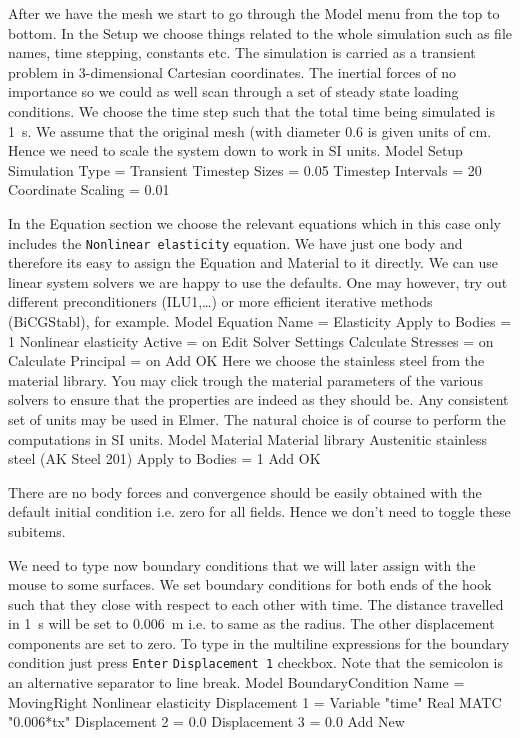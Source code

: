 After we have the mesh we start to go through the Model menu from the top to bottom. 
In the Setup we choose things related to the whole simulation such as file names, 
time stepping, constants etc.
The simulation is carried as a transient problem in 3-dimensional Cartesian
coordinates. The inertial forces of no importance so we could as well scan through a set of steady state
loading conditions. We choose the time step such that the total time being simulated is 1~s.
We assume that the original mesh (with diameter 0.6 is given units of cm. Hence we need to scale the
system down to work in SI units. 
\ttbegin
Model
  Setup 
    Simulation Type = Transient
    Timestep Sizes = 0.05
    Timestep Intervals = 20
    Coordinate Scaling = 0.01
\ttend

In the Equation section we choose the relevant equations which in this case only includes 
the \texttt{Nonlinear elasticity} equation.  We have just one body and therefore its easy to assign 
the Equation and Material to it directly.  We can use linear system solvers we are happy to 
use the defaults. One may however, try out different preconditioners (ILU1,\ldots) or more 
efficient iterative methods (BiCGStabl), for example.
\ttbegin
Model
  Equation
    Name = Elasticity
    Apply to Bodies = 1
    Nonlinear elasticity
      Active = on
      Edit Solver Settings
        Calculate Stresses = on
        Calculate Principal = on
    Add 
    OK
\ttend        
Here we choose the stainless steel from the material library.
You may click trough the material parameters of the various solvers to ensure that
the properties are indeed as they should be. Any consistent set of units may be used in Elmer.
The natural choice is of course to perform the computations in SI units. 
\ttbegin
Model
  Material
    Material library    
      Austenitic stainless steel (AK Steel 201)
    Apply to Bodies = 1 
    Add
    OK
\ttend

There are no body forces and convergence should be easily obtained with the default 
initial condition i.e. zero for all fields. Hence we don't need to toggle these subitems. 

We need to type now boundary conditions that we will later assign with the mouse to some surfaces.
We set boundary conditions for both ends of the hook such that
they close with respect to each other with time. The distance travelled in 1~s will be set to
0.006~m i.e. to same as the radius. The other displacement components are set to zero.  
To type in the multiline expressions for the boundary condition just press \texttt{Enter}
\texttt{Displacement 1} checkbox.
Note that the semicolon is an alternative separator
to line break. 
\ttbegin
Model
  BoundaryCondition
    Name = MovingRight
    Nonlinear elasticity
      Displacement 1 = Variable "time"
        Real MATC "0.006*tx"
      Displacement 2 = 0.0
      Displacement 3 = 0.0
    Add
    New


